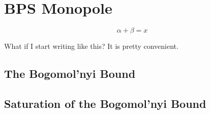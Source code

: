 \documentclass[main.tex]{subfiles}
\begin{document}
\section{BPS Monopole}

\begin{equation}
    \alpha + \beta = x
\end{equation}

What if I start writing like this? It is pretty convenient.

\subsection{The Bogomol'nyi Bound}
\subsection{Saturation of the Bogomol'nyi Bound}
\end{document}
